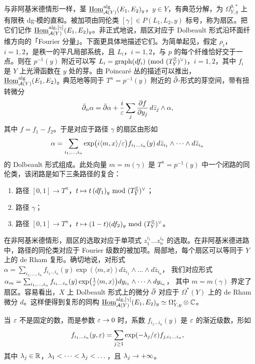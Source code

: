 与非阿基米德情形一样，茎 $\underline{\operatorname{Hom}}^{\mathrm{alg}}_{\mathcal{A}(Y)}(E_1,E_2)_y$，$y\in Y$，有典范分解，为 $\Omega^{0,*}_{Y,y}$ 上有限秩 dg-模的直和。被加项由同伦类 $[\gamma]\in P(L_1,L_2,y)$ 标号，称为扇区。把它们记作 $\underline{\operatorname{Hom}}^{\mathrm{alg},[\gamma]}_{\mathcal{A}(Y)}(E_1,E_2)_y$。非正式地说，扇区对应于 Dolbeault 形式沿环面纤维方向的「Fourier 分量」。下面更具体地描述它们。为简单起见，假定 $\rho_i$，$i=1,2$，是秩一的平凡局部系统，且 $L_i$，$i=1,2$，与 $p$ 的每个纤维恰好交于一点。则在 $p^{-1}(y)$ 附近可以写 $L_i=\operatorname{graph}(df_i)\ (\mathrm{mod}\ (T^{\Z}_Y)^{\vee})$，$i=1,2$，其中 $f_i$ 是 $Y$ 上光滑函数在 $y$ 处的芽。由 Poincaré 丛的描述可以推出，$\underline{\operatorname{Hom}}^{\mathrm{alg}}_{\mathcal{A}(Y)}(E_1,E_2)_y$ 典范地等同于 $T^n=p^{-1}(y)$ 附近的 $\bar\partial$-形式的芽空间，带有扭转微分
\[
\bar\partial_{\alpha}\alpha=\bar\partial\alpha+\frac{i}{\varepsilon}\sum_j\frac{\partial f}{\partial y_j}\,d\bar z_j\wedge\alpha,
\]
其中 $f=f_1-f_2$。于是对应于路径 $\gamma$ 的扇区由形如
\[
\alpha=\sum_{i_1,\dots,i_n}\exp\bigl(i\langle m,x\rangle/\varepsilon\bigr)f_{i_1\dots i_n}(y)\,d\bar z_{i_1}\wedge\dots\wedge d\bar z_{i_n}
\]
的 Dolbeault 形式组成。此处向量 $m=m(\gamma)$ 是 $T^n=p^{-1}(y)$ 中一个闭路的同伦类，该闭路是如下三条路径的复合：
\begin{enumerate}[label=\arabic*),leftmargin=2.2em,itemsep=2pt,topsep=3pt]
\item 路径 $[0,1]\to T^n$，$t\mapsto t\,(df_1)_y\ \mathrm{mod}\ (T^{\Z}_Y)^{\vee}$；
\item 路径 $\gamma$；
\item 路径 $[0,1]\to T^n$，$t\mapsto(1-t)(df_2)_y\ \mathrm{mod}\ (T^{\Z}_Y)^{\vee}$。
\end{enumerate}

在非阿基米德情形，扇区的选取对应于单项式 $z_1^{i_1}\dots z_n^{i_n}$ 的选取。在非阿基米德进路中，路径的同伦类对应于 Fourier 级数的被加项。局部地，每个扇区可以等同于 $Y$ 上的 de Rham 复形。确切地说，对形式
$\alpha=\sum_{i_1,\dots,i_n}f_{i_1\dots i_n}(y)\exp(\langle m,x\rangle)d\bar z_{i_1}\wedge\dots\wedge d\bar z_{i_n}$，
我们对应形式
$\alpha_m=\sum_{i_1,\dots,i_n}f_{i_1\dots i_n}(y)\exp\bigl(\tfrac{1}{\varepsilon}\langle m,x\rangle\bigr)dy_{i_1}\wedge\dots\wedge dy_{i_n}$，
其中 $m=m(\gamma)$ 界定了扇区。容易看出，$X$ 上 Dolbeault 形式上的微分 $\bar\partial$ 对应于 $\Omega^{*}(Y)$ 上的 de Rham 微分 $d$。这样便得到复形的同构
$\underline{\operatorname{Hom}}^{\mathrm{alg},[\gamma]}_{\mathcal{A}(Y)}(E_1,E_2)_y\simeq\Omega^{*}_{Y,y}\otimes\mathbb{C}$。

\begin{rmk}
当 $\varepsilon$ 不是固定的数，而是参数 $\varepsilon\to 0$ 时，系数 $f_{i_1\dots i_n}(y)$ 是 $\varepsilon$ 的渐近级数，形如
\[
f_{i_1\dots i_n}(y,\varepsilon)=\sum_{j\ge 1}\exp(-\lambda_j/\varepsilon)f_{j,i_1\dots i_n},
\]
其中 $\lambda_j\in\mathbb{R}$，$\lambda_1<\dots<\lambda_j<\dots$，且 $\lambda_j\to+\infty$。
\end{rmk}

